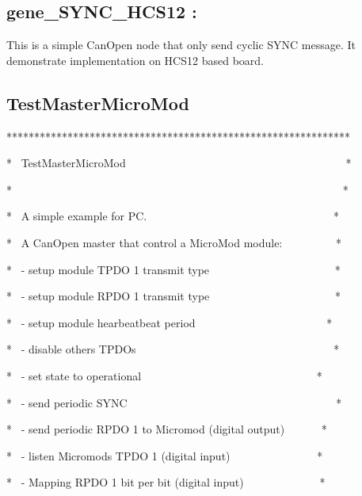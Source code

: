 \documentclass[12pt,twoside]{article}
\begin{document}
\subsection{gene\_SYNC\_HCS12 :}
This is a simple CanOpen node that only send cyclic SYNC message. It
demonstrate implementation on HCS12 based board.


\bigskip

\subsection{TestMasterMicroMod }
{\ttfamily
**************************************************************}

{\ttfamily
* \ TestMasterMicroMod
\ \ \ \ \ \ \ \ \ \ \ \ \ \ \ \ \ \ \ \ \ \ \ \ \ \ \ \ \ \ \ \ \ \ \ \ \ \ \ *}

{\ttfamily
*
\ \ \ \ \ \ \ \ \ \ \ \ \ \ \ \ \ \ \ \ \ \ \ \ \ \ \ \ \ \ \ \ \ \ \ \ \ \ \ \ \ \ \ \ \ \ \ \ \ \ \ \ \ \ \ \ \ \ \ *}

{\ttfamily
* \ A simple example for PC.
\ \ \ \ \ \ \ \ \ \ \ \ \ \ \ \ \ \ \ \ \ \ \ \ \ \ \ \ \ \ \ \ \ *}

{\ttfamily
* \ A CanOpen master that control a MicroMod module:
\ \ \ \ \ \ \ \ \ *}

{\ttfamily
* \ {}- setup module TPDO 1 transmit type
\ \ \ \ \ \ \ \ \ \ \ \ \ \ \ \ \ \ \ \ \ \ *}

{\ttfamily
* \ {}- setup module RPDO 1 transmit type
\ \ \ \ \ \ \ \ \ \ \ \ \ \ \ \ \ \ \ \ \ \ *}

{\ttfamily
* \ {}- setup module hearbeatbeat period
\ \ \ \ \ \ \ \ \ \ \ \ \ \ \ \ \ \ \ \ \ \ \ *}

{\ttfamily
* \ {}- disable others TPDOs
\ \ \ \ \ \ \ \ \ \ \ \ \ \ \ \ \ \ \ \ \ \ \ \ \ \ \ \ \ \ \ \ \ \ \ *}

{\ttfamily
* \ {}- set state to operational
\ \ \ \ \ \ \ \ \ \ \ \ \ \ \ \ \ \ \ \ \ \ \ \ \ \ \ \ \ \ \ *}

{\ttfamily
* \ {}- send periodic SYNC
\ \ \ \ \ \ \ \ \ \ \ \ \ \ \ \ \ \ \ \ \ \ \ \ \ \ \ \ \ \ \ \ \ \ \ \ \ *}

{\ttfamily
* \ {}- send periodic RPDO 1 to Micromod (digital output) \ \ \ \ \ \ *}

{\ttfamily
* \ {}- listen Micromod{\textquotesingle}s TPDO 1 (digital input)
\ \ \ \ \ \ \ \ \ \ \ \ \ \ \ *}

{\ttfamily
* \ {}- Mapping RPDO 1 bit per bit (digital input)
\ \ \ \ \ \ \ \ \ \ \ \ \ *}
\end{document}
